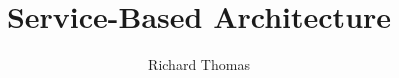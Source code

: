 \documentclass{csse4400}
\title{Service-Based Architecture}
\author{Richard Thomas}
\date{\week{3}}
\begin{document}
\makecover



%
%
\end{document}
